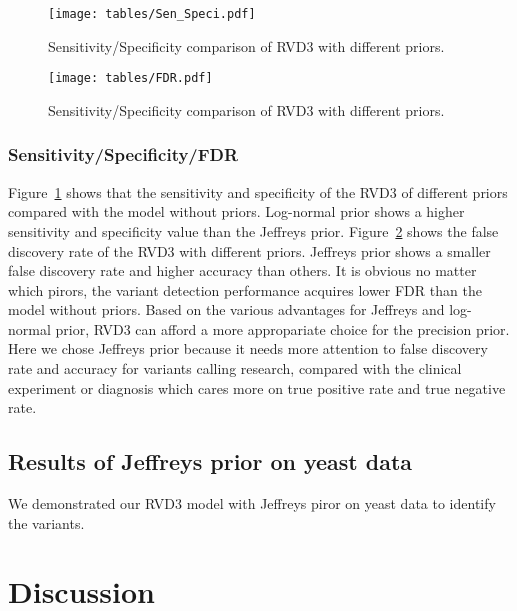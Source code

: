 \documentclass[11pt,reqno]{amsart}
\begin{document}
\begin{figure}[h]
\begin{center}
\texttt{[image: tables/Sen\_Speci.pdf]}
\caption{Sensitivity/Specificity comparison of RVD3 with different priors.}
\label{tbl:SS}
\end{center}
\end{figure}

\begin{figure}[h]
\begin{center}
\texttt{[image: tables/FDR.pdf]}
\caption{Sensitivity/Specificity comparison of RVD3 with different priors.}
\label{tbl:FDR}
\end{center}
\end{figure}

\subsubsection{Sensitivity/Specificity/FDR}

Figure~\ref{tbl:SS} shows that the sensitivity and specificity of the RVD3 of different priors compared with the model without priors. Log-normal prior shows a higher sensitivity and specificity value than the Jeffreys prior.
Figure~\ref{tbl:FDR} shows the false discovery rate of the RVD3 with different priors. Jeffreys prior shows a smaller false discovery rate and higher accuracy than others. It is obvious no matter which pirors, the variant detection performance acquires lower FDR than the model without priors. Based on the various advantages for Jeffreys and log-normal prior, RVD3 can afford a more appropariate choice for the precision prior. Here we chose Jeffreys prior because it needs more attention to false discovery rate and accuracy for variants calling research, compared with the clinical experiment or diagnosis which cares more on true positive rate and true negative rate.
\subsection{Results of Jeffreys prior on yeast data}

We demonstrated our RVD3 model with Jeffreys piror on yeast data to identify the variants.


\section{Discussion}
\end{document}

